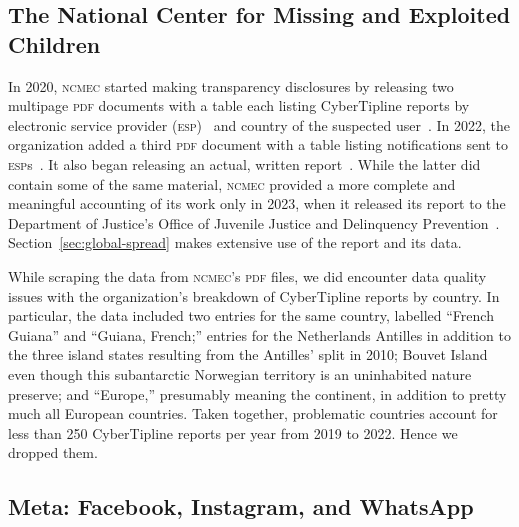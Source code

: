 \documentclass[nonacm,screen]{acmart}
\newcommand\V[1]{\textsc{\MakeLowercase{#1}}}
\begin{document}
\begin{itemize}
{\subsection{The National Center for Missing and Exploited Children}

In 2020, \V{NCMEC} started making transparency disclosures by releasing two
multipage \V{PDF} documents with a table each listing CyberTipline reports by
electronic service provider (\V{ESP})~\cite{NcmecByPlatform2019,
NcmecByPlatform2020,NcmecByPlatform2021,NcmecByPlatform2022} and country of the
suspected user~\cite{NcmecByCountry2019,NcmecByCountry2020,NcmecByCountry2021,
NcmecByCountry2020}. In 2022, the organization added a third \V{PDF} document
with a table listing notifications sent to
\V{ESP}s~\cite{NcmecNotifications2021,NcmecNotifications2022}. It also began
releasing an actual, written
report~\cite{NcmecCyberTipline2021,NcmecCyberTipline2022}. While the latter did
contain some of the same material, \V{NCMEC} provided a more complete and
meaningful accounting of its work only in 2023, when it released its report to
the Department of Justice's Office of Juvenile Justice and Delinquency
Prevention~\cite{NCMEC2023}. Section~\ref{sec:global-spread} makes extensive use
of the report and its data.

While scraping the data from \V{NCMEC}'s \V{PDF} files, we did encounter data
quality issues with the organization's breakdown of CyberTipline reports by
country. In particular, the data included two entries for the same country,
labelled ``French Guiana'' and ``Guiana, French;'' entries for the Netherlands
Antilles in addition to the three island states resulting from the Antilles'
split in 2010; Bouvet Island even though this subantarctic Norwegian territory
is an uninhabited nature preserve; and ``Europe,'' presumably meaning the
continent, in addition to pretty much all European countries. Taken together,
problematic countries account for less than 250 CyberTipline reports per year
from 2019 to 2022. Hence we dropped them.


\subsection{Meta: Facebook, Instagram, and WhatsApp}

}
\end{itemize}
\end{document}
